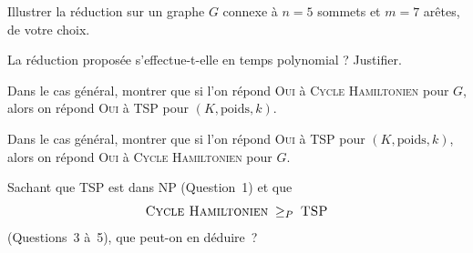 \begin{exercice}
\begin{questions}
  \item Illustrer la réduction sur un graphe $G$ connexe à $n = 5$ sommets et $m = 7$ arêtes, de votre choix.

  \item La réduction proposée s’effectue-t-elle en temps polynomial ? Justifier.

  \item Dans le cas général, montrer que si l’on répond \textsc{Oui} à \textsc{Cycle Hamiltonien} pour $G$, alors on répond \textsc{Oui} à \textsc{TSP} pour $(K, \text{poids}, k)$.

  \item Dans le cas général, montrer que si l’on répond \textsc{Oui} à \textsc{TSP} pour $(K, \text{poids}, k)$, alors on répond \textsc{Oui} à \textsc{Cycle Hamiltonien} pour $G$.

  \item Sachant que \textsc{TSP} est dans NP (Question~1) et que
    \[
    \textsc{Cycle Hamiltonien} \;\ge_P\; \textsc{TSP}
    \]
    (Questions~3 à~5), que peut-on en déduire~?

  \end{questions}

\end{exercice}

